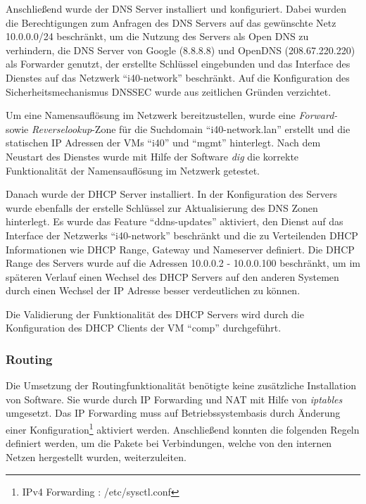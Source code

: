 Anschließend wurde der \ac{DNS} Server installiert und konfiguriert. Dabei wurden die Berechtigungen zum Anfragen des \ac{DNS} Servers auf das gewünschte Netz 10.0.0.0/24 beschränkt, um die Nutzung des Servers als Open \ac{DNS} zu verhindern, die \ac{DNS} Server von Google (8.8.8.8) und OpenDNS (208.67.220.220) als Forwarder genutzt, der erstellte Schlüssel eingebunden und das Interface des Dienstes auf das Netzwerk "`i40-network"' beschränkt. Auf die Konfiguration des Sicherheitsmechanismus DNSSEC wurde aus zeitlichen Gründen verzichtet.

Um eine Namensauflösung im Netzwerk bereitzustellen, wurde eine \textit{Forward-} sowie \textit{Reverselookup}-Zone für die Suchdomain "`i40-network.lan"' erstellt und die statischen \ac{IP} Adressen der \ac{VM}s "`i40"' und "`mgmt"' hinterlegt. Nach dem Neustart des Dienstes wurde mit Hilfe der Software \textit{dig} die korrekte Funktionalität der Namensauflösung im Netzwerk getestet.

Danach wurde der \ac{DHCP} Server installiert. In der Konfiguration des Servers wurde ebenfalls der erstelle Schlüssel zur Aktualisierung des \ac{DNS} Zonen hinterlegt. Es wurde das Feature "`ddns-updates"' aktiviert, den Dienst auf das Interface der Netzwerks "`i40-network"' beschränkt und die zu Verteilenden \ac{DHCP} Informationen wie \ac{DHCP} Range, Gateway und Nameserver definiert. Die \ac{DHCP} Range des Servers wurde auf die Adressen 10.0.0.2 - 10.0.0.100 beschränkt, um im späteren Verlauf einen Wechsel des \ac{DHCP} Servers auf den anderen Systemen durch einen Wechsel der \ac{IP} Adresse besser verdeutlichen zu können.

Die Validierung der Funktionalität des \ac{DHCP} Servers wird durch die Konfiguration des \ac{DHCP} Clients der \ac{VM} "`comp"' durchgeführt.

\subsubsection{Routing}
Die Umsetzung der Routingfunktionalität benötigte keine zusätzliche Installation von Software. Sie wurde durch \ac{IP} Forwarding und \ac{NAT} mit Hilfe von \textit{iptables} umgesetzt. Das \ac{IP} Forwarding muss auf Betriebssystembasis durch Änderung einer Konfiguration\footnote{IPv4 Forwarding : /etc/sysctl.conf} aktiviert werden. Anschließend konnten die folgenden Regeln definiert werden, um die Pakete bei Verbindungen, welche von den internen Netzen hergestellt wurden, weiterzuleiten.



